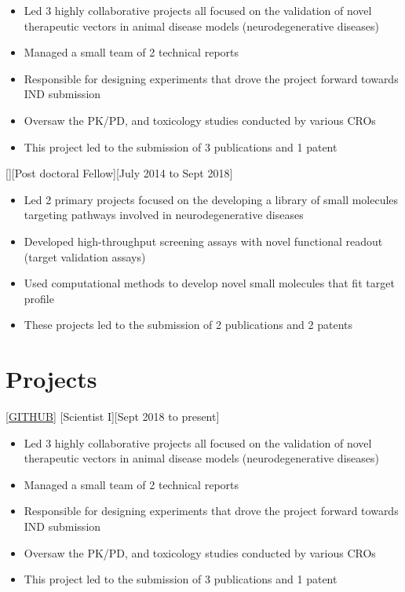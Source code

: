 \documentclass{article}
\begin{document}
\begin{itemize}
\item Led 3 highly collaborative projects all focused on the validation of novel therapeutic vectors in animal disease models (neurodegenerative diseases)
\item Managed a small team of 2 technical reports
\item Responsible for designing experiments that drove the project forward towards IND submission
\item Oversaw the PK/PD, and toxicology studies conducted by various CROs
\item This project led to the submission of 3 publications and 1 patent
\end{itemize}

[][Post doctoral Fellow][July 2014 to Sept 2018]

\begin{itemize}
\item Led 2 primary projects focused on the developing a library of small molecules targeting pathways involved in neurodegenerative diseases
\item Developed high-throughput screening assays with novel functional readout (target validation assays)
\item Used computational methods to develop novel small molecules that fit target profile
\item These projects led to the submission of 2 publications and 2 patents
\end{itemize}

\section{Projects}

[\href{https://github.com/Mayank0255}{GITHUB}]
[Scientist I][Sept 2018 to present]

\begin{itemize}
\item Led 3 highly collaborative projects all focused on the validation of novel therapeutic vectors in animal disease models (neurodegenerative diseases)
\item Managed a small team of 2 technical reports
\item Responsible for designing experiments that drove the project forward towards IND submission
\item Oversaw the PK/PD, and toxicology studies conducted by various CROs
\item This project led to the submission of 3 publications and 1 patent
\end{itemize}
\end{document}

